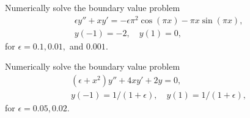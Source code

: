 Numerically solve the boundary value problem
\begin{align*}
	\epsilon y'' + xy' = -\epsilon \pi^2 \cos(\pi x) - \pi x \sin(\pi x), \\
	y(-1) = -2, \quad y(1) = 0,
\end{align*}
for $\epsilon = 0.1, 0.01,$ and $0.001$.
\label{prob:finitedifference2:prob4}

Numerically solve the boundary value problem
\begin{align*}
	(\epsilon +x^2)y'' + 4xy' + 2y = 0, \\
	y(-1) = 1/(1+\epsilon), \quad y(1) = 1/(1+\epsilon),
\end{align*}
for $\epsilon = 0.05, 0.02$.
\label{prob:finitedifference2:prob5}
